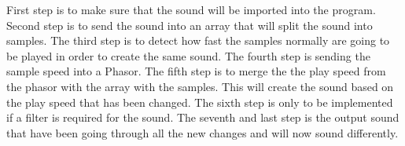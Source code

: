 First step is to make sure that the sound will be imported into the program. 
Second step is to send the sound into an array that will split the sound into samples. 
The third step is to detect how fast the samples normally are going to be played in order to create the same sound. 
The fourth step is sending the sample speed into a Phasor. 
The fifth step is to merge the the play speed from the phasor with the array with the samples. 
This will create the sound based on the play speed that has been changed. 
The sixth step is only to be implemented if a filter is required for the sound. 
The seventh and last step is the output sound that have been going through all the new changes and will now sound differently.




